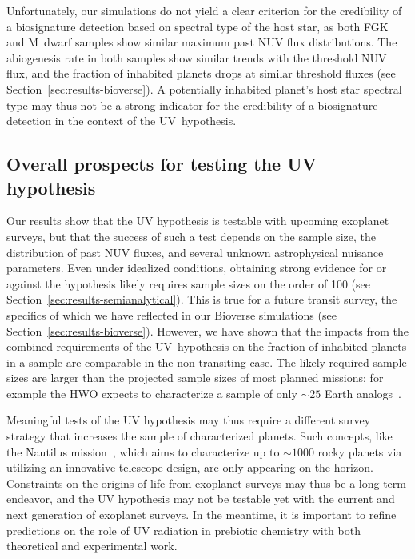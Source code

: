 \documentclass[twocolumn,twocolappendix,linenumbers]{aastex631}
\begin{document}
Unfortunately, our simulations do not yield a clear criterion for the credibility of a biosignature detection based on spectral type of the host star, as both FGK and M~dwarf samples show similar maximum past \gls{NUV} flux distributions.
The abiogenesis rate in both samples show similar trends with the threshold \gls{NUV} flux, and the fraction of inhabited planets drops at similar threshold fluxes (see Section~\ref{sec:results-bioverse}).
A potentially inhabited planet's host star spectral type may thus not be a strong indicator for the credibility of a biosignature detection in the context of the UV~hypothesis.

\subsection{Overall prospects for testing the UV hypothesis} %
Our results show that the UV hypothesis is testable with upcoming exoplanet surveys, but that the success of such a test depends on the sample size, the distribution of past \gls{NUV} fluxes, and several unknown astrophysical nuisance parameters.
Even under idealized conditions, obtaining strong evidence for or against the hypothesis likely requires sample sizes on the order of 100 (see Section~\ref{sec:results-semianalytical}).
This is true for a future transit survey, the specifics of which we have reflected in our Bioverse simulations (see Section~\ref{sec:results-bioverse}).
However, we have shown that the impacts from the combined requirements of the UV~hypothesis on the fraction of inhabited planets in a sample are comparable in the non-transiting case.
The likely required sample sizes are larger than the projected sample sizes of most planned missions; for example the \gls{HWO} expects to characterize a sample of only $\sim 25$ Earth analogs~\citep{Mamajek2023,Tuchow2024}.

Meaningful tests of the UV hypothesis may thus require a different survey strategy that increases the sample of characterized planets.
Such concepts, like the Nautilus mission~\citep{Apai2019,Apai2022}, which aims to characterize up to $\sim 1000$ rocky planets via utilizing an innovative telescope design, are only appearing on the horizon.
Constraints on the origins of life from exoplanet surveys may thus be a long-term endeavor, and the UV hypothesis may not be testable yet with the current and next generation of exoplanet surveys.
In the meantime, it is important to refine predictions on the role of UV radiation in prebiotic chemistry with both theoretical and experimental work.
\end{document}

